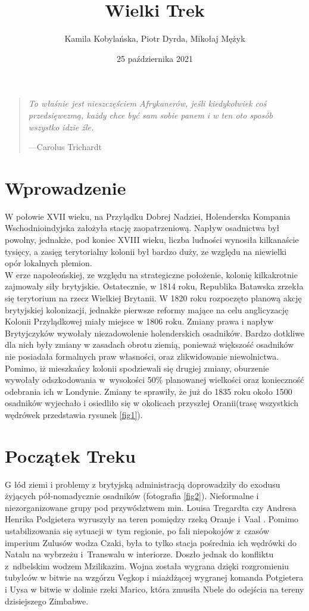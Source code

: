 \documentclass[12pt, twocolumn]{article}
\title{Wielki Trek}
\author{Kamila Kobylańska, Piotr Dyrda, Mikołaj Mężyk}
\date{25 października 2021}
\begin{document}
\maketitle
\begin{quote}
  \textit{To właśnie jest nieszczęściem Afrykanerów, jeśli kiedykolwiek coś przedsięwezmą, każdy chce być sam sobie panem i w ten oto sposób wszystko idzie źle.}
  \begin{flushright}
    \tiny{---Carolus Trichardt}
  \end{flushright}
\end{quote}

\section{Wprowadzenie}

\lettrine{W}{ }  połowie XVII wieku, na Przylądku Dobrej Nadziei, Holenderska Kompania Wschodnioindyjska założyła stację zaopatrzeniową. Napływ osadnictwa był powolny, jednakże, pod koniec XVIII wieku, liczba ludności wynosiła kilkanaście tysięcy, a zasięg terytorialny kolonii był bardzo duży, ze względu na niewielki opór lokalnych plemion. \\
W erze napoleońskiej, ze względu na strategiczne położenie, kolonię kilkakrotnie zajmowały siły brytyjskie. Ostatecznie, w 1814 roku, Republika Batawska zrzekła się terytorium na rzecz Wielkiej Brytanii. W 1820 roku rozpoczęto planową akcję brytyjskiej kolonizacji, jednakże pierwsze reformy mające na celu anglicyzację Kolonii Przylądkowej miały miejsce w 1806 roku. Zmiany prawa i napływ Brytyjczyków wywołały niezadowolenie holenderskich osadników. Bardzo dotkliwe dla nich były zmiany w zasadach obrotu ziemią, ponieważ większość osadników nie posiadała formalnych praw własności, oraz zlikwidowanie niewolnictwa. Pomimo, iż mieszkańcy kolonii spodziewali się drugiej zmiany, oburzenie wywołały odszkodowania w~wysokości 50\% planowanej wielkości oraz konieczność odebrania ich w Londynie. Zmiany te sprawiły, że już do 1835 roku około 1500 osadników wyjechało i osiedliło się w okolicach przyszłej Oranii(trasę wszystkich wędrówek przedstawia rysunek \ref{fig1}).

\section{Początek Treku}

\lettrine{G}{} łód ziemi i problemy z brytyjską administracją doprowadziły do exodusu żyjących pół-nomadycznie osadników (fotografia \ref{fig2}). Nieformalne i niezorganizowane grupy pod przywództwem min. Louisa Tregardta czy Andresa Henrika Podgietera wyruszyły na teren pomiędzy rzeką Oranje i~Vaal . Pomimo ustabilizowania się sytuacji w~tym regionie, po fali niepokojów z~czasów imperium Zulusów wodza Czaki, była to tylko stacja pośrednia ich wędrówki do Natalu na wybrzeżu i~Transwalu w interiorze. Doszło jednak do konfliktu z~ndbelskim wodzem Mzilikazim. Wojna została wygrana dzięki rozgromieniu tubylców w bitwie na wzgórzu Vegkop i miażdżącej wygranej komanda Potgietera i Uysa w bitwie w dolinie rzeki Marico, która zmusiła Nbele do odejścia na tereny dzisiejszego Zimbabwe. 
\end{document}
